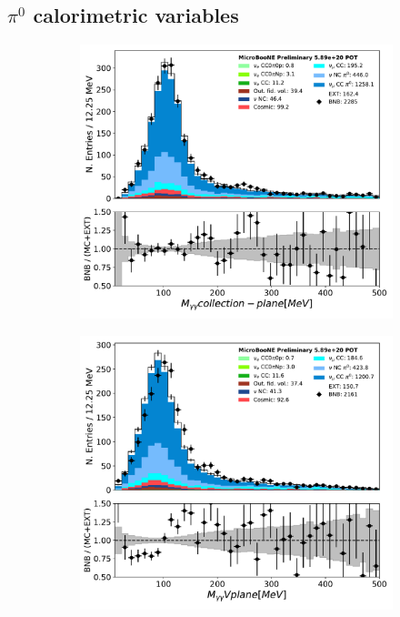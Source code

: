 \subsection{$\pi^0$ calorimetric variables}
\label{app:pi0:calorimetry}

\begin{figure}[H] 
\begin{center}
    \begin{subfigure}[b]{0.3\textwidth}
    \centering
    \includegraphics[width=1.00\textwidth]{pi0/calorimetry/pi0_mass_Y_03112020_ALL_scaled.pdf}
    \caption{}
    \end{subfigure}
    \begin{subfigure}[b]{0.3\textwidth}
    \centering
    \includegraphics[width=1.00\textwidth]{pi0/calorimetry/pi0_mass_V_03112020_ALL_scaled.pdf}

\end{subfigure}
\end{center}
\end{figure}
